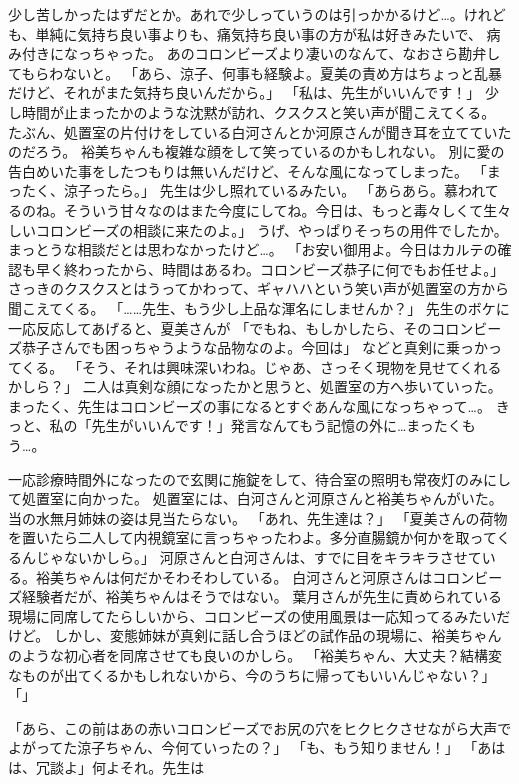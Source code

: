 少し苦しかったはずだとか。あれで少しっていうのは引っかかるけど…。けれども、単純に気持ち良い事よりも、痛気持ち良い事の方が私は好きみたいで、
病み付きになっちゃった。
あのコロンビーズより凄いのなんて、なおさら勘弁してもらわないと。
「あら、涼子、何事も経験よ。夏美の責め方はちょっと乱暴だけど、それがまた気持ち良いんだから。」
「私は、先生がいいんです！」
少し時間が止まったかのような沈黙が訪れ、クスクスと笑い声が聞こえてくる。
たぶん、処置室の片付けをしている白河さんとか河原さんが聞き耳を立てていたのだろう。
裕美ちゃんも複雑な顔をして笑っているのかもしれない。
別に愛の告白めいた事をしたつもりは無いんだけど、そんな風になってしまった。
「まったく、涼子ったら。」
先生は少し照れているみたい。
「あらあら。慕われてるのね。そういう甘々なのはまた今度にしてね。今日は、もっと毒々しくて生々しいコロンビーズの相談に来たのよ。」
うげ、やっぱりそっちの用件でしたか。まっとうな相談だとは思わなかったけど…。
「お安い御用よ。今日はカルテの確認も早く終わったから、時間はあるわ。コロンビーズ恭子に何でもお任せよ。」
さっきのクスクスとはうってかわって、ギャハハという笑い声が処置室の方から聞こえてくる。
「……先生、もう少し上品な渾名にしませんか？」
先生のボケに一応反応してあげると、夏美さんが
「でもね、もしかしたら、そのコロンビーズ恭子さんでも困っちゃうような品物なのよ。今回は」
などと真剣に乗っかってくる。
「そう、それは興味深いわね。じゃあ、さっそく現物を見せてくれるかしら？」
二人は真剣な顔になったかと思うと、処置室の方へ歩いていった。
まったく、先生はコロンビーズの事になるとすぐあんな風になっちゃって…。
きっと、私の「先生がいいんです！」発言なんてもう記憶の外に…まったくもう…。


一応診療時間外になったので玄関に施錠をして、待合室の照明も常夜灯のみにして処置室に向かった。
処置室には、白河さんと河原さんと裕美ちゃんがいた。当の水無月姉妹の姿は見当たらない。
「あれ、先生達は？」
「夏美さんの荷物を置いたら二人して内視鏡室に言っちゃったわよ。多分直腸鏡か何かを取ってくるんじゃないかしら。」
河原さんと白河さんは、すでに目をキラキラさせている。裕美ちゃんは何だかそわそわしている。
白河さんと河原さんはコロンビーズ経験者だが、裕美ちゃんはそうではない。
葉月さんが先生に責められている現場に同席してたらしいから、コロンビーズの使用風景は一応知ってるみたいだけど。
しかし、変態姉妹が真剣に話し合うほどの試作品の現場に、裕美ちゃんのような初心者を同席させても良いのかしら。
「裕美ちゃん、大丈夫？結構変なものが出てくるかもしれないから、今のうちに帰ってもいいんじゃない？」
「」

「あら、この前はあの赤いコロンビーズでお尻の穴をヒクヒクさせながら大声でよがってた涼子ちゃん、今何ていったの？」
「も、もう知りません！」
「あはは、冗談よ」何よそれ。先生は


